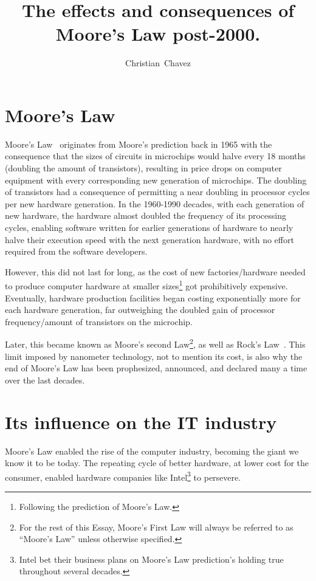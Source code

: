 \documentclass[a4paper,12pt]{article}
\begin{document}
\title{The effects and consequences of Moore's Law post-2000.}
\author{Christian~Chavez}

\maketitle

\section*{Moore's Law}

Moore's Law~\cite{Moore:2000:CMC:333067.333074} originates from Moore's prediction back in 1965 with the consequence that the sizes of circuits in microchips would halve every 18 months (doubling the amount of transistors), resulting in price drops on computer equipment with every corresponding new generation of microchips.
The doubling of transistors had a consequence of permitting a near doubling in processor cycles per new hardware generation.
In the 1960-1990 decades, with each generation of new hardware, the hardware almost doubled the frequency of its processing cycles, enabling software written for earlier generations of hardware to nearly halve their execution speed with the next generation hardware, with no effort required from the software developers.

However, this did not last for long, as the cost of new factories/hardware needed to produce computer hardware at smaller sizes\footnote{Following the prediction of Moore's Law.} got prohibitively expensive.
Eventually, hardware production facilities began costing exponentially more for each hardware generation, far outweighing the doubled gain of processor frequency/amount of transistors on the microchip.

Later, this became known as Moore's second Law\footnote{For the rest of this Essay, Moore's First Law will always be referred to as ``Moore's Law'' unless otherwise specified.}, as well as Rock's Law~\cite{Ross:2003:EC:965307.965316}.
This limit imposed by nanometer technology, not to mention its cost, is also why the end of Moore's Law has been prophesized, announced, and declared many a time over the last decades.

\section*{Its influence on the IT industry}

Moore's Law enabled the rise of the computer industry, becoming the giant we know it to be today.
The repeating cycle of better hardware, at lower cost for the consumer, enabled hardware companies like Intel\footnote{Intel bet their business plans on Moore's Law prediction's holding true throughout several decades\cite{IntelMoore'sLawIn10nm,Moore40,Moore50}.} to persevere.
\end{document}
